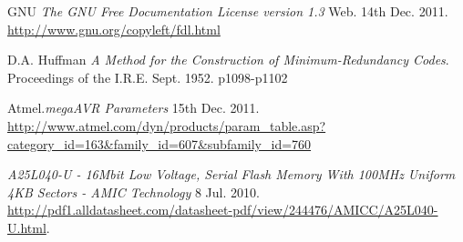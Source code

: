 \begin{thebibliography}{9}
	 GNU \emph{The GNU Free Documentation License version 1.3} Web. 14th Dec. 2011. \url{http://www.gnu.org/copyleft/fdl.html}

	 D.A. Huffman \textit{A Method for the Construction of Minimum-Redundancy Codes}. Proceedings of the I.R.E. Sept. 1952. p1098-p1102


	 Atmel.\textit{megaAVR Parameters} 15th Dec. 2011. \url{http://www.atmel.com/dyn/products/param_table.asp?category_id=163&family_id=607&subfamily_id=760}

	 \emph{A25L040-U - 16Mbit Low Voltage, Serial Flash Memory With 100MHz Uniform 4KB Sectors - AMIC Technology} 8 Jul. 2010. \url{http://pdf1.alldatasheet.com/datasheet-pdf/view/244476/AMICC/A25L040-U.html}.


\end{thebibliography} 
